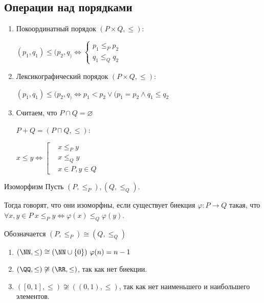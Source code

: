 \subsection{Операции над порядками}
\begin{enumerate}
    \item
        Покоординатный порядок \( (P \times Q, \leq) \):

        \(
            (p_1, q_1) \leq (p_2, q_)
            \Leftrightarrow
            \begin{cases}
                p_1 \leq_P p_2
                \\
                q_1 \leq_Q q_2
            \end{cases}
        \)
    \item
        Лексикографический порядок \( (P \times Q, \leq) \):

        \(
            (p_1, q_1) \leq (p_2, q_)
            \Leftrightarrow
            p_1 < p_2 \lor (p_1 = p_2 \land q_1 \leq q_2
        \)
    \item
        Считаем, что \( P \cap Q = \varnothing \)

        \( P + Q = (P \sqcap Q, \leq): \)

        \( x \leq y
            \Leftrightarrow
            \left[
                \begin{aligned}
                    & x \leq_P y
                    \\
                    & x \leq_Q y
                    \\
                    & x \in P, y \in Q
                \end{aligned}
            \right.
        \)
\end{enumerate}

\begin{defn}{Изоморфизм}{}
    Пусть \( (P, \leq_P), (Q, \leq_Q) \).

    Тогда говорят, что они изоморфны, если существует биекция \( \varphi : P \to Q \) такая,
    что \( \forall x, y \in P \ x \leq_P y \Leftrightarrow \varphi(x) \leq_Q \varphi(y) \).

    Обозначается \( (P, \leq_P) \cong (Q, \leq_Q) \)
\end{defn}

\begin{example}{}{}
    \begin{enumerate}
        \item
            \( (\NN, \leq) \cong (\NN \cup \{ 0 \}) \ \varphi(n) = n - 1 \)
        \item
            \( (\QQ, \leq) \not\cong (\RR, \leq) \), так как нет биекции.
        \item
            \( ([0, 1], \leq) \not\cong ((0, 1), \leq) \), так как нет наименьшего и наибольшего элементов.
    \end{enumerate}
\end{example}

